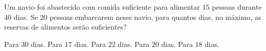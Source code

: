 Um navio foi abastecido com comida suficiente para alimentar $15$ pessoas durante $40$ dias. Se $20$ pessoas embarcarem nesse navio, para quantos dias, no máximo, as reservas de alimentos serão suficientes?

Para $30$ dias.
Para $17$ dias.
Para $22$ dias.
Para $20$ dias.
Para $18$ dias.



